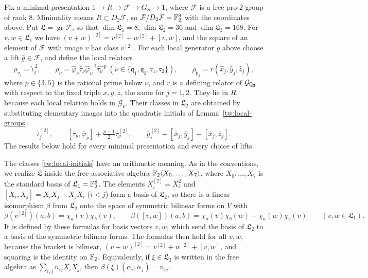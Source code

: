 Fix a minimal presentation $1\to R\to\mathcal F\to G_S\to1$, where
$\mathcal F$ is a free pro-$2$ group of rank $8$. Minimality means
$R\subset D_2\mathcal F$, so $\mathcal F/D_2\mathcal F=\mathbb F_2^8$ with the
coordinates above. Put $\mathfrak L=\operatorname{gr}\mathcal F$, so that
$\dim\mathfrak L_1=8$, $\dim\mathfrak L_2=36$ and $\dim\mathfrak L_3=168$.
For $v,w\in\mathfrak L_1$ we have $(v+w)^{[2]}=v^{[2]}+w^{[2]}+[v,w]$, and the
square of an element of $\mathcal F$ with image $v$ has class $v^{[2]}$. For
each local generator $g$ above choose a lift $\hat g\in\mathcal F$, and define
the local relators
\begin{equation}\label{tw:relators}
 \rho_{v_j}=\hat\iota_j^{\,2},\qquad
 \rho_\nu=\hat\varphi_\nu\hat\tau_\nu\hat\varphi_\nu^{-1}\hat\tau_\nu^{-p}
 \ (\nu\in\{\mathfrak q_1,\mathfrak q_2,\mathfrak r_1,\mathfrak r_2\}),\qquad
 \rho_{\mathfrak p_j}=r(\hat x_j,\hat y_j,\hat z_j),
\end{equation}
where $p\in\{3,5\}$ is the rational prime below $\nu$, and $r$ is a
defining relator of $\mathcal G_{\mathbb Q_2}$ with respect to the fixed triple
$x,y,z$, the same for $j=1,2$. They lie in $R$, because each local relation
holds in $\mathcal G_\nu$. Their classes in $\mathfrak L_2$ are obtained by
substituting elementary images into the quadratic initials of
Lemma~\ref{tw:local-groups}:
\begin{equation}\label{tw:local-initials}
 \bar\iota_j^{\,[2]},\qquad
 [\bar\tau_\nu,\bar\varphi_\nu]+\tfrac{p-1}2\bar\tau_\nu^{\,[2]},\qquad
 \bar y_j^{\,[2]}+[\bar x_j,\bar y_j]+[\bar x_j,\bar z_j].
\end{equation}
The results below hold for every minimal presentation and every choice of
lifts.

The classes \eqref{tw:local-initials} have an arithmetic meaning. As in the
conventions, we realize $\mathfrak L$ inside the free associative algebra
$\mathbb F_2\langle X_0,\dots,X_7\rangle$, where $X_0,\dots,X_7$ is the standard
basis of $\mathfrak L_1=\mathbb F_2^8$. The
elements $X_i^{[2]}=X_i^2$ and $[X_i,X_j]=X_iX_j+X_jX_i$ ($i<j$) form a
basis of $\mathfrak L_2$, so there is a linear isomorphism $\beta$ from
$\mathfrak L_2$ onto the space of symmetric bilinear forms on $V$ with
\[
 \beta(v^{[2]})(a,b)=\chi_a(v)\chi_b(v),\qquad
 \beta([v,w])(a,b)=\chi_a(v)\chi_b(w)+\chi_a(w)\chi_b(v)
 \qquad(v,w\in\mathfrak L_1).
\]
It is defined by these formulas for basis vectors $v,w$, which send the basis
of $\mathfrak L_2$ to a basis of the symmetric bilinear forms. The formulas
then hold for all $v,w$, because the bracket is bilinear,
$(v+w)^{[2]}=v^{[2]}+w^{[2]}+[v,w]$, and squaring is the identity on $\mathbb F_2$.
Equivalently, if $\xi\in\mathfrak L_2$ is written in the free algebra as
$\sum_{i,j}n_{ij}X_iX_j$, then $\beta(\xi)(\alpha_i,\alpha_j)=n_{ij}$.

